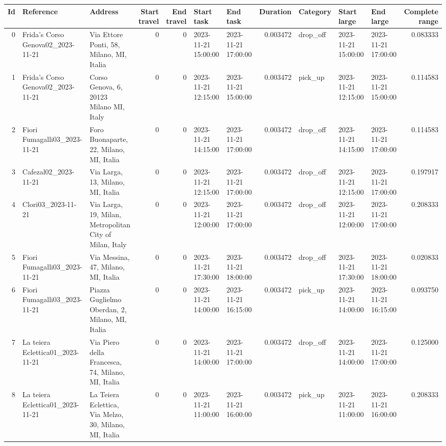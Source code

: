 \documentclass[titlepage]{article}
\begin{document}
\begin{table}[H]
\centering
\begin{adjustbox}{max width=\textwidth}
\begin{tabular}{rllrrllrlllr}
\toprule
Id & Reference & Address & Start travel & End travel & Start task & End task & Duration & Category & Start large & End large & Complete range \\
\midrule
0 & Frida's Corso Genova02\_2023-11-21 & Via Ettore Ponti, 58, Milano, MI, Italia & 0 & 0 & 2023-11-21 15:00:00 & 2023-11-21 17:00:00 & 0.003472 & drop\_off & 2023-11-21 15:00:00 & 2023-11-21 17:00:00 & 0.083333 \\
1 & Frida's Corso Genova02\_2023-11-21 & Corso Genova, 6, 20123 Milano MI, Italy & 0 & 0 & 2023-11-21 12:15:00 & 2023-11-21 15:00:00 & 0.003472 & pick\_up & 2023-11-21 12:15:00 & 2023-11-21 15:00:00 & 0.114583 \\
2 & Fiori Fumagalli03\_2023-11-21 & Foro Buonaparte, 22, Milano, MI, Italia & 0 & 0 & 2023-11-21 14:15:00 & 2023-11-21 17:00:00 & 0.003472 & drop\_off & 2023-11-21 14:15:00 & 2023-11-21 17:00:00 & 0.114583 \\
3 & Cafezal02\_2023-11-21 & Via Larga, 13, Milano, MI, Italia & 0 & 0 & 2023-11-21 12:15:00 & 2023-11-21 17:00:00 & 0.003472 & drop\_off & 2023-11-21 12:15:00 & 2023-11-21 17:00:00 & 0.197917 \\
4 & Clori03\_2023-11-21 & Via Larga, 19, Milan, Metropolitan City of Milan, Italy & 0 & 0 & 2023-11-21 12:00:00 & 2023-11-21 17:00:00 & 0.003472 & drop\_off & 2023-11-21 12:00:00 & 2023-11-21 17:00:00 & 0.208333 \\
5 & Fiori Fumagalli03\_2023-11-21 & Via Messina, 47, Milano, MI, Italia & 0 & 0 & 2023-11-21 17:30:00 & 2023-11-21 18:00:00 & 0.003472 & drop\_off & 2023-11-21 17:30:00 & 2023-11-21 18:00:00 & 0.020833 \\
6 & Fiori Fumagalli03\_2023-11-21 & Piazza Guglielmo Oberdan, 2, Milano, MI, Italia & 0 & 0 & 2023-11-21 14:00:00 & 2023-11-21 16:15:00 & 0.003472 & pick\_up & 2023-11-21 14:00:00 & 2023-11-21 16:15:00 & 0.093750 \\
7 & La teiera Eclettica01\_2023-11-21 & Via Piero della Francesca, 74, Milano, MI, Italia & 0 & 0 & 2023-11-21 14:00:00 & 2023-11-21 17:00:00 & 0.003472 & drop\_off & 2023-11-21 14:00:00 & 2023-11-21 17:00:00 & 0.125000 \\
8 & La teiera Eclettica01\_2023-11-21 & La Teiera Eclettica, Via Melzo, 30, Milano, MI, Italia & 0 & 0 & 2023-11-21 11:00:00 & 2023-11-21 16:00:00 & 0.003472 & pick\_up & 2023-11-21 11:00:00 & 2023-11-21 16:00:00 & 0.208333 \\

\end{tabular}
\end{adjustbox}
\end{table}
\end{document}
